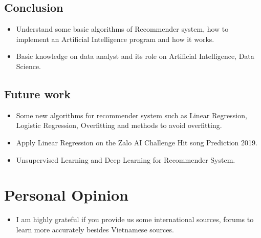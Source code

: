 \documentclass[12pt]{article}
\begin{document}
\subsection{Conclusion}

\begin{itemize}
	\item Understand some basic algorithms of Recommender system, how to implement an Artificial Intelligence program and how it works.
	\item Basic knowledge on data analyst and its role on Artificial Intelligence, Data Science.
\end{itemize}
\subsection{Future work}
\begin{itemize}
	\item Some new algorithms for recommender system such as Linear Regression, Logistic Regression, Overfitting and methods to avoid overfitting.
	\item Apply Linear Regression on the Zalo AI Challenge Hit song Prediction 2019.
	\item Unsupervised Learning and Deep Learning for Recommender System.
\end{itemize}

\section{Personal Opinion}
\begin{itemize}
	\item I am highly grateful if you provide us some international sources, forums to learn more accurately besides Vietnamese sources.
\end{itemize}
\end{document}
